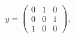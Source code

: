 \begin{equation}
y=\left(
\begin{array}{ccc}
0 & 1 & 0 \\
0 & 0 & 1 \\
1 & 0 & 0
\end{array}
\right) ,
\end{equation}

